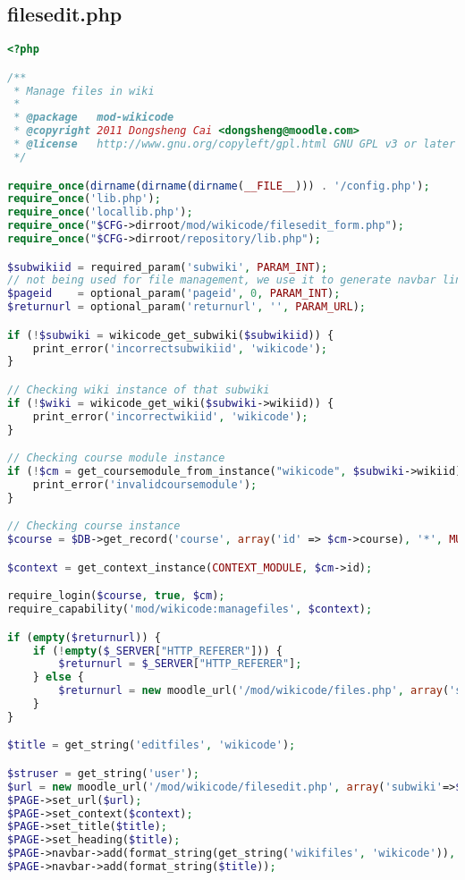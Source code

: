 \subsection{filesedit.php}
\begin{lstlisting}[language=PHP]
<?php

/**
 * Manage files in wiki
 *
 * @package   mod-wikicode
 * @copyright 2011 Dongsheng Cai <dongsheng@moodle.com>
 * @license   http://www.gnu.org/copyleft/gpl.html GNU GPL v3 or later
 */

require_once(dirname(dirname(dirname(__FILE__))) . '/config.php');
require_once('lib.php');
require_once('locallib.php');
require_once("$CFG->dirroot/mod/wikicode/filesedit_form.php");
require_once("$CFG->dirroot/repository/lib.php");

$subwikiid = required_param('subwiki', PARAM_INT);
// not being used for file management, we use it to generate navbar link
$pageid    = optional_param('pageid', 0, PARAM_INT);
$returnurl = optional_param('returnurl', '', PARAM_URL);

if (!$subwiki = wikicode_get_subwiki($subwikiid)) {
    print_error('incorrectsubwikiid', 'wikicode');
}

// Checking wiki instance of that subwiki
if (!$wiki = wikicode_get_wiki($subwiki->wikiid)) {
    print_error('incorrectwikiid', 'wikicode');
}

// Checking course module instance
if (!$cm = get_coursemodule_from_instance("wikicode", $subwiki->wikiid)) {
    print_error('invalidcoursemodule');
}

// Checking course instance
$course = $DB->get_record('course', array('id' => $cm->course), '*', MUST_EXIST);

$context = get_context_instance(CONTEXT_MODULE, $cm->id);

require_login($course, true, $cm);
require_capability('mod/wikicode:managefiles', $context);

if (empty($returnurl)) {
    if (!empty($_SERVER["HTTP_REFERER"])) {
        $returnurl = $_SERVER["HTTP_REFERER"];
    } else {
        $returnurl = new moodle_url('/mod/wikicode/files.php', array('subwiki'=>$subwiki->id));
    }
}

$title = get_string('editfiles', 'wikicode');

$struser = get_string('user');
$url = new moodle_url('/mod/wikicode/filesedit.php', array('subwiki'=>$subwiki->id, 'pageid'=>$pageid));
$PAGE->set_url($url);
$PAGE->set_context($context);
$PAGE->set_title($title);
$PAGE->set_heading($title);
$PAGE->navbar->add(format_string(get_string('wikifiles', 'wikicode')), $CFG->wwwroot . '/mod/wikicode/files.php?pageid=' . $pageid);
$PAGE->navbar->add(format_string($title));


\end{lstlisting}
